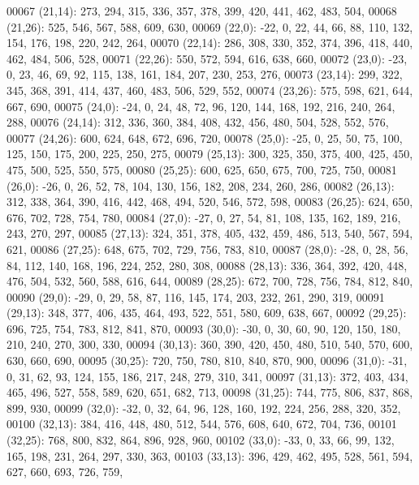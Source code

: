 \begin{DoxyCode}
00067       (21,14): 273, 294, 315, 336, 357, 378, 399, 420, 441, 462, 483, 504,
00068       (21,26): 525, 546, 567, 588, 609, 630,
00069       (22,0): -22, 0, 22, 44, 66, 88, 110, 132, 154, 176, 198, 220, 242, 264,
00070       (22,14): 286, 308, 330, 352, 374, 396, 418, 440, 462, 484, 506, 528,
00071       (22,26): 550, 572, 594, 616, 638, 660,
00072       (23,0): -23, 0, 23, 46, 69, 92, 115, 138, 161, 184, 207, 230, 253, 276,
00073       (23,14): 299, 322, 345, 368, 391, 414, 437, 460, 483, 506, 529, 552,
00074       (23,26): 575, 598, 621, 644, 667, 690,
00075       (24,0): -24, 0, 24, 48, 72, 96, 120, 144, 168, 192, 216, 240, 264, 288,
00076       (24,14): 312, 336, 360, 384, 408, 432, 456, 480, 504, 528, 552, 576,
00077       (24,26): 600, 624, 648, 672, 696, 720,
00078       (25,0): -25, 0, 25, 50, 75, 100, 125, 150, 175, 200, 225, 250, 275,
00079       (25,13): 300, 325, 350, 375, 400, 425, 450, 475, 500, 525, 550, 575,
00080       (25,25): 600, 625, 650, 675, 700, 725, 750,
00081       (26,0): -26, 0, 26, 52, 78, 104, 130, 156, 182, 208, 234, 260, 286,
00082       (26,13): 312, 338, 364, 390, 416, 442, 468, 494, 520, 546, 572, 598,
00083       (26,25): 624, 650, 676, 702, 728, 754, 780,
00084       (27,0): -27, 0, 27, 54, 81, 108, 135, 162, 189, 216, 243, 270, 297,
00085       (27,13): 324, 351, 378, 405, 432, 459, 486, 513, 540, 567, 594, 621,
00086       (27,25): 648, 675, 702, 729, 756, 783, 810,
00087       (28,0): -28, 0, 28, 56, 84, 112, 140, 168, 196, 224, 252, 280, 308,
00088       (28,13): 336, 364, 392, 420, 448, 476, 504, 532, 560, 588, 616, 644,
00089       (28,25): 672, 700, 728, 756, 784, 812, 840,
00090       (29,0): -29, 0, 29, 58, 87, 116, 145, 174, 203, 232, 261, 290, 319,
00091       (29,13): 348, 377, 406, 435, 464, 493, 522, 551, 580, 609, 638, 667,
00092       (29,25): 696, 725, 754, 783, 812, 841, 870,
00093       (30,0): -30, 0, 30, 60, 90, 120, 150, 180, 210, 240, 270, 300, 330,
00094       (30,13): 360, 390, 420, 450, 480, 510, 540, 570, 600, 630, 660, 690,
00095       (30,25): 720, 750, 780, 810, 840, 870, 900,
00096       (31,0): -31, 0, 31, 62, 93, 124, 155, 186, 217, 248, 279, 310, 341,
00097       (31,13): 372, 403, 434, 465, 496, 527, 558, 589, 620, 651, 682, 713,
00098       (31,25): 744, 775, 806, 837, 868, 899, 930,
00099       (32,0): -32, 0, 32, 64, 96, 128, 160, 192, 224, 256, 288, 320, 352,
00100       (32,13): 384, 416, 448, 480, 512, 544, 576, 608, 640, 672, 704, 736,
00101       (32,25): 768, 800, 832, 864, 896, 928, 960,
00102       (33,0): -33, 0, 33, 66, 99, 132, 165, 198, 231, 264, 297, 330, 363,
00103       (33,13): 396, 429, 462, 495, 528, 561, 594, 627, 660, 693, 726, 759,

\end{DoxyCode}

